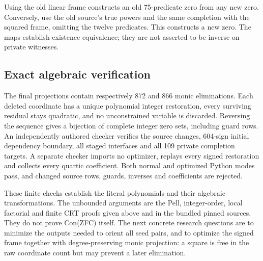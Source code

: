 Using the old linear frame constructs an old 75-predicate zero from
any new zero.  Conversely, use the old source's true powers and the
same completion with the squared frame, omitting the twelve predicates.
This constructs a new zero.  The maps establish existence equivalence;
they are not asserted to be inverse on private witnesses.

\subsection{Exact algebraic verification}

The final projections contain respectively 872 and 866 monic
eliminations.  Each deleted coordinate has a unique polynomial
integer restoration, every surviving residual stays quadratic,
and no unconstrained variable is discarded.  Reversing the sequence
gives a bijection of complete integer zero sets, including guard rows.
An independently authored checker verifies the source changes,
604-sign initial dependency boundary, all staged interfaces and
all 109 private completion targets.  A separate checker imports no
optimizer, replays every signed restoration and collects every
quartic coefficient.  Both normal and optimized Python modes pass,
and changed source rows, guards, inverses and coefficients are rejected.

These finite checks establish the literal polynomials and their
algebraic transformations.  The unbounded arguments are the Pell,
integer-order, local factorial and finite CRT proofs given above and
in the bundled pinned sources.  They do not prove Con(ZFC) itself.
The next concrete research questions are to minimize the outputs
needed to orient all seed pairs, and to optimize the signed frame
together with degree-preserving monic projection: a square is free
in the raw coordinate count but may prevent a later elimination.
